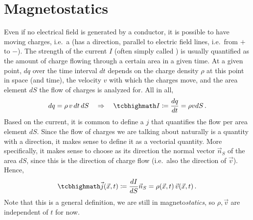 \documentclass[../class_mech_main.tex]{subfiles}
\begin{document}
    \section{Magnetostatics}
Even if no electrical field is generated by a conductor, it is possible to have moving charges, i.e.~a  (has a direction, parallel to electric field lines, i.e.~from $+$ to $-$). The strength of the current $I$ (often simply called ) is usually quantified as the amount of charge flowing through a certain area in a given time. At a given point, $dq$ over the time interval $dt$ depends on the charge density $\rho$ at this point in space (and time), the velocity $v$ with which the charges move, and the area element $dS$ the flow of charges is analyzed for. All in all,
\begin{equation}
        dq = \rho \, v \, dt \, dS
    \quad\Rightarrow\quad
    \eqbox{
        I \coloneqq \dv{q}{t} = \rho v dS
    } \, .  
\end{equation}
Based on the current, it is common to define a  $j$ that quantifies the flow per area element $dS$. Since the flow of charges we are talking about naturally is a quantity with a direction, it makes sense to define it as a vectorial quantity. More specifically, it makes sense to choose as its direction the normal vector $\vec{n}_S$ of the area $dS$, since this is the direction of charge flow (i.e.~also the direction of $\vec{v}$). Hence,
\begin{equation}
    \eqbox{
        \vec{j}(\vec{x}, t) \coloneqq \dv{I}{S} \vec{n}_S = \rho(\vec{x}, t) \, \vec{v}(\vec{x}, t)
    } \, .
\end{equation}
Note that this is a general definition, we are still in magneto\emph{statics}, so $\rho, \vec{v}$ are independent of $t$ for now.
\\
\end{document}
